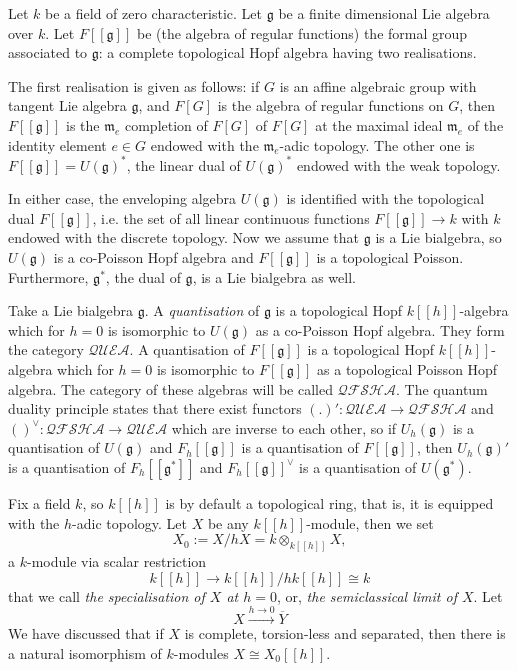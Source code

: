 \documentclass[8pt]{article}
\theoremstyle{definition}
\theoremstyle{definition}
\theoremstyle{definition}
\theoremstyle{definition}
\theoremstyle{definition}
\theoremstyle{definition}
\theoremstyle{definition}
\theoremstyle{definition}
\theoremstyle{definition}
\theoremstyle{definition}
\theoremstyle{definition}
\theoremstyle{definition}
\theoremstyle{definition}
\theoremstyle{definition}
\theoremstyle{question}
\begin{document}
Let $k$ be a field of zero characteristic. Let $\mathfrak{g}$ be a finite dimensional
Lie algebra over $k$. Let $F[[\mathfrak{g}]]$ be (the algebra of regular functions) the formal
group associated to $\mathfrak{g}$: a complete topological Hopf algebra having two realisations.

The first realisation is given as follows: if $G$ is an affine algebraic group with tangent Lie 
algebra $\mathfrak{g}$, and $F[G]$ is the algebra of regular functions on $G$, then $F[[\mathfrak{g}]]$
is the $\mathfrak{m}_e$ completion of $F[G]$ of $F[G]$ at the maximal ideal $\mathfrak{m}_e$ of the identity element
$e \in G$ endowed with the $\mathfrak{m}_e$-adic topology. The other one is $F[[\mathfrak{g}]] = U(\mathfrak{g})^*$,
the linear dual of $U(\mathfrak{g})^*$ endowed with the weak topology. 

In either case, the enveloping algebra $U(\mathfrak{g})$ is identified with the topological dual $F[[\mathfrak{g}]]$, i.e.
the set of all linear continuous functions $F[[\mathfrak{g}]] \to k$ with $k$ endowed with the discrete topology.
Now we assume that $\mathfrak{g}$ is a Lie bialgebra, so $U(\mathfrak{g})$ is a co-Poisson Hopf algebra 
and $F[[\mathfrak{g}]]$ is a topological Poisson. Furthermore, $\mathfrak{g}^*$, the dual of $\mathfrak{g}$,
is a Lie bialgebra as well. 

Take a Lie bialgebra $\mathfrak{g}$. A \emph{quantisation} of $\mathfrak{g}$ is a topological Hopf $k[[h]]$-algebra
which for $h = 0$ is isomorphic to $U(\mathfrak{g})$ as a co-Poisson Hopf algebra. They form the category $\mathcal{QUEA}$.
A quantisation of $F[[\mathfrak{g}]]$ is a topological Hopf $k[[h]]$-algebra which for $h = 0$ is isomorphic
to $F[[\mathfrak{g}]]$ as a topological Poisson Hopf algebra. The category of these algebras will be called 
$\mathcal{QFSHA}$. The quantum duality principle states that there exist functors $(.)' : \mathcal{QUEA} \to \mathcal{QFSHA}$
and $()^{\vee} : \mathcal{QFSHA} \to \mathcal{QUEA}$ which are inverse to each other, so if $U_h(\mathfrak{g})$
is a quantisation of $U(\mathfrak{g})$ and $F_h[[\mathfrak{g}]]$ is a quantisation of $F[[\mathfrak{g}]]$,
then $U_h(\mathfrak{g})'$ is a quantisation of $F_h[[\mathfrak{g}^*]]$ and $F_h[[\mathfrak{g}]]^{\vee}$ is a quantisation
of $U(\mathfrak{g}^*)$. 
 
Fix a field $k$, so $k[[h]]$ is by default a topological ring, that is, it is equipped with
the $h$-adic topology. Let $X$ be any $k[[h]]$-module, then we set 
\[
X_0 := X/hX = k \otimes_{k[[h]]} X,
\]
a $k$-module via scalar restriction
\[
k[[h]] \to k[[h]]/h k[[h]] \cong k
\]
that we call \emph{the specialisation of $X$ at $h = 0$}, or, \emph{the semiclassical limit of $X$}.
Let
\[
X \xrightarrow{h \to 0} \overline{Y}
\]
We have discussed that if $X$ is complete, torsion-less and separated, then there is a natural
isomorphism of $k$-modules $X \cong X_0[[h]]$.
\end{document}

